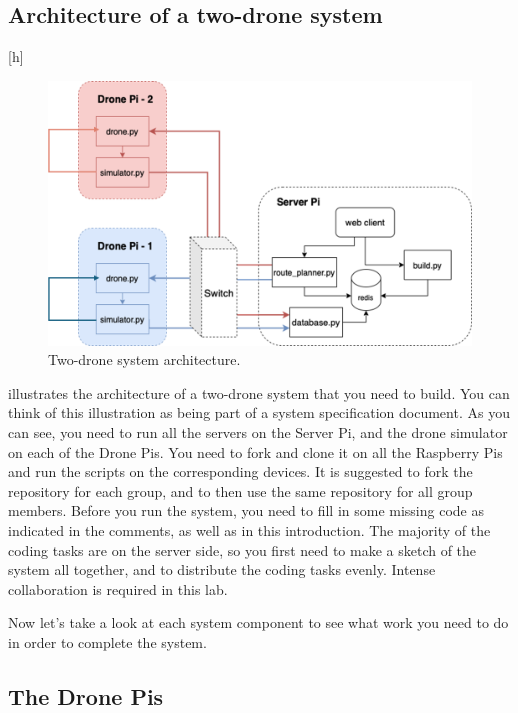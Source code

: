 \documentclass{article}
\begin{document}
\subsection{Architecture of a two-drone system}[h]
\begin{figure}
    \centering
    \includegraphics[width=\linewidth]{architecture.png}
    \caption{Two-drone system architecture.}
    \label{fig:sys}
\end{figure}
 illustrates the architecture of a two-drone system that you need to build. You can think of this illustration as being part of a system specification document. As you can see, you need to run all the servers on the Server Pi, and the drone simulator on each of the Drone Pis. You need to fork {} and clone it on all the Raspberry Pis and run the scripts on the corresponding devices. It is suggested to fork the repository for each group, and to then use the same repository for all group members. Before you run the system, you need to fill in some missing code as indicated in the comments, as well as in this introduction. The majority of the coding tasks are on the server side, so you first need to make a sketch of the system all together, and to distribute the coding tasks evenly. Intense collaboration is required in this lab.

Now let's take a look at each system component to see what work you need to do in order to complete the system.
\subsection{The Drone Pis}
\end{document}
